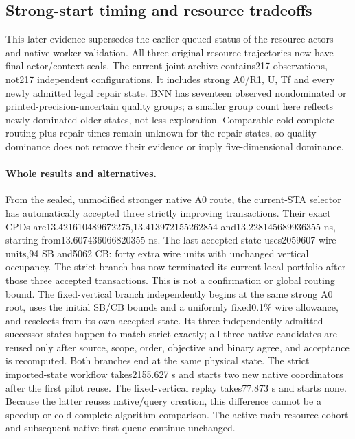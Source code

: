 \subsection{Strong-start timing and resource tradeoffs}
This later evidence supersedes the earlier queued status of the resource actors and native-worker validation. All three original resource trajectories now have final actor/context seals. The current joint archive contains217 observations, not217 independent configurations. It includes strong A0/R1, U, Tf and every newly admitted legal repair state. BNN has seventeen observed nondominated or printed-precision-uncertain quality groups; a smaller group count here reflects newly dominated older states, not less exploration. Comparable cold complete routing-plus-repair times remain unknown for the repair states, so quality dominance does not remove their evidence or imply five-dimensional dominance.

\paragraph{Whole results and alternatives.}
From the sealed, unmodified stronger native A0 route, the current-STA selector has automatically accepted three strictly improving transactions. Their exact CPDs are13.421610489672275,13.413972155262854 and13.228145689936355 ns, starting from13.607436066820355 ns. The last accepted state uses2059607 wire units,94 SB and5062 CB: forty extra wire units with unchanged vertical occupancy. The strict branch has now terminated its current local portfolio after those three accepted transactions. This is not a confirmation or global routing bound. The fixed-vertical branch independently begins at the same strong A0 root, uses the initial SB/CB bounds and a uniformly fixed0.1\% wire allowance, and reselects from its own accepted state. Its three independently admitted successor states happen to match strict exactly; all three native candidates are reused only after source, scope, order, objective and binary agree, and acceptance is recomputed. Both branches end at the same physical state. The strict imported-state workflow takes2155.627 s and starts two new native coordinators after the first pilot reuse. The fixed-vertical replay takes77.873 s and starts none. Because the latter reuses native/query creation, this difference cannot be a speedup or cold complete-algorithm comparison. The active main resource cohort and subsequent native-first queue continue unchanged.

